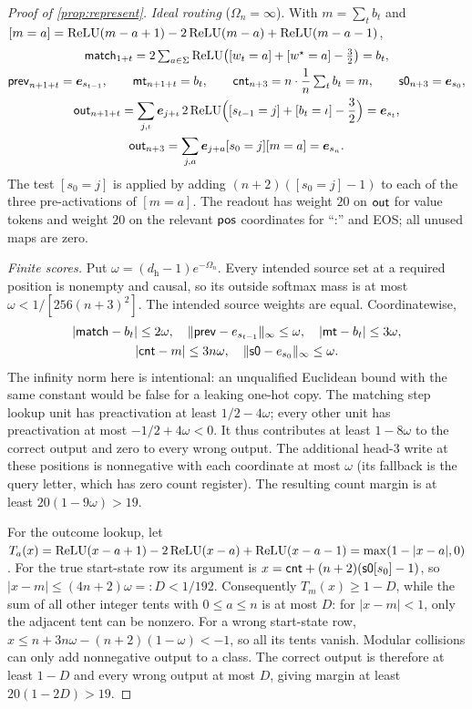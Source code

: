 \begin{proof}[Proof of \cref{prop:represent}]
\emph{Ideal routing} ($\Omega_n=\infty$). With $m=\sum_tb_t$ and $[m=a]=\operatorname{ReLU}(m-a+1)-2\operatorname{ReLU}(m-a)+\operatorname{ReLU}(m-a-1)$,
\begin{gather*}
 \reg{match}_{1+t}=2\textstyle\sum_{a\in\Sigma}\relu\bigl([w_t=a]+[w^\star=a]-\frac{3}{2}\bigr)=b_t,\\
 \reg{prev}_{n+1+t}=\bm e_{s_{t-1}},\qquad \reg{mt}_{n+1+t}=b_t,\qquad
 \reg{cnt}_{n+3}=n\cdot\tfrac{1}{n}\textstyle\sum_tb_t=m,\qquad \reg{s0}_{n+3}=\bm e_{s_0},\\
 \reg{out}_{n+1+t}=\sum_{j,\iota}\bm e_{j+\iota}\,2\relu\Bigl([s_{t-1}=j]+[b_t=\iota]-\frac{3}{2}\Bigr)=\bm e_{s_t},\\
 \reg{out}_{n+3}=\sum_{j,a}\bm e_{j+a}[s_0=j][m=a]=\bm e_{s_n}.
\end{gather*}
The test $[s_0=j]$ is applied by adding $(n+2)([s_0=j]-1)$ to each of the three pre-activations of $[m=a]$. The readout has weight $20$
on $\mathsf{out}$ for value tokens and weight $20$ on the relevant $\mathsf{pos}$ coordinates for ``:'' and EOS; all unused maps are zero.

\emph{Finite scores.} Put $\omega=(d_{\mathrm h}-1)e^{-\Omega_n}$. Every intended source set at a required position is nonempty and causal, so its outside softmax mass is at most $\omega<1/[256(n+3)^2]$. The intended source weights are equal. Coordinatewise,
\[\begin{gathered}
|\mathsf{match}-b_t|\le2\omega,\quad
\|\mathsf{prev}-e_{s_{t-1}}\|_\infty\le\omega,\quad
|\mathsf{mt}-b_t|\le3\omega,\\
|\mathsf{cnt}-m|\le3n\omega,\quad
\|\mathsf{s0}-e_{s_0}\|_\infty\le\omega.
\end{gathered}\]
The infinity norm here is intentional: an unqualified Euclidean bound with the same constant would be false for a leaking one-hot copy. The matching step lookup unit has preactivation at least $1/2-4\omega$; every other unit has preactivation at most $-1/2+4\omega<0$. It thus contributes at least $1-8\omega$ to the correct output and zero to every wrong output. The additional head-3 write at these positions is nonnegative with each coordinate at most $\omega$ (its fallback is the query letter, which has zero count register). The resulting count margin is at least $20(1-9\omega)>19$.

For the outcome lookup, let $T_a(x)=\operatorname{ReLU}(x-a+1)-2\operatorname{ReLU}(x-a)+\operatorname{ReLU}(x-a-1)=\max(1-|x-a|,0)$. For the true start-state row its argument is
$x=\mathsf{cnt}+(n+2)(\mathsf{s0}[s_0]-1)$, so
$|x-m|\le(4n+2)\omega=:D<1/192$. Consequently $T_m(x)\ge1-D$, while the sum of all other integer tents with $0\le a\le n$ is at most $D$: for $|x-m|<1$, only the adjacent tent can be nonzero. For a wrong start-state row, $x\le n+3n\omega-(n+2)(1-\omega)<-1$, so all its tents vanish. Modular collisions can only add nonnegative output to a class. The correct output is therefore at least $1-D$ and every wrong output at most $D$, giving margin at least $20(1-2D)>19$.


\end{proof}
